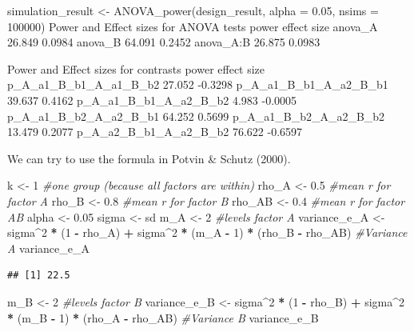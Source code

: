 \documentclass[]{book}
\newenvironment{Shaded}{\begin{snugshade}}{\end{snugshade}}
\newcommand{\CommentTok}[1]{\textcolor[rgb]{0.56,0.35,0.01}{\textit{#1}}}
\newcommand{\DecValTok}[1]{\textcolor[rgb]{0.00,0.00,0.81}{#1}}
\newcommand{\FloatTok}[1]{\textcolor[rgb]{0.00,0.00,0.81}{#1}}
\newcommand{\NormalTok}[1]{#1}
\newcommand{\OperatorTok}[1]{\textcolor[rgb]{0.81,0.36,0.00}{\textbf{#1}}}
\newcommand{\StringTok}[1]{\textcolor[rgb]{0.31,0.60,0.02}{#1}}
\begin{document}
simulation\_result \textless{}- ANOVA\_power(design\_result, alpha = 0.05, nsims = 100000)
Power and Effect sizes for ANOVA tests
power effect size
anova\_A 26.849 0.0984
anova\_B 64.091 0.2452
anova\_A:B 26.875 0.0983

Power and Effect sizes for contrasts
power effect size
p\_A\_a1\_B\_b1\_A\_a1\_B\_b2 27.052 -0.3298
p\_A\_a1\_B\_b1\_A\_a2\_B\_b1 39.637 0.4162
p\_A\_a1\_B\_b1\_A\_a2\_B\_b2 4.983 -0.0005
p\_A\_a1\_B\_b2\_A\_a2\_B\_b1 64.252 0.5699
p\_A\_a1\_B\_b2\_A\_a2\_B\_b2 13.479 0.2077
p\_A\_a2\_B\_b1\_A\_a2\_B\_b2 76.622 -0.6597

We can try to use the formula in Potvin \& Schutz (2000).

\begin{Shaded}
\begin{Highlighting}[]
\NormalTok{k <-}\StringTok{ }\DecValTok{1} \CommentTok{#one group (because all factors are within)}
\NormalTok{rho_A <-}\StringTok{ }\FloatTok{0.5} \CommentTok{#mean r for factor A}
\NormalTok{rho_B <-}\StringTok{ }\FloatTok{0.8} \CommentTok{#mean r for factor B}
\NormalTok{rho_AB <-}\StringTok{ }\FloatTok{0.4} \CommentTok{#mean r for factor AB}
\NormalTok{alpha <-}\StringTok{ }\FloatTok{0.05}
\NormalTok{sigma <-}\StringTok{ }\NormalTok{sd}
\NormalTok{m_A <-}\StringTok{ }\DecValTok{2} \CommentTok{#levels factor A}
\NormalTok{variance_e_A <-}\StringTok{ }\NormalTok{sigma}\OperatorTok{^}\DecValTok{2} \OperatorTok{*}\StringTok{ }\NormalTok{(}\DecValTok{1} \OperatorTok{-}\StringTok{ }\NormalTok{rho_A) }\OperatorTok{+}\StringTok{ }\NormalTok{sigma}\OperatorTok{^}\DecValTok{2} \OperatorTok{*}\StringTok{ }\NormalTok{(m_A }\OperatorTok{-}\StringTok{ }\DecValTok{1}\NormalTok{) }\OperatorTok{*}\StringTok{ }\NormalTok{(rho_B }\OperatorTok{-}\StringTok{ }\NormalTok{rho_AB) }\CommentTok{#Variance A}
\NormalTok{variance_e_A}
\end{Highlighting}
\end{Shaded}

\begin{verbatim}
## [1] 22.5
\end{verbatim}

\begin{Shaded}
\begin{Highlighting}[]
\NormalTok{m_B <-}\StringTok{ }\DecValTok{2} \CommentTok{#levels factor B}
\NormalTok{variance_e_B <-}\StringTok{ }\NormalTok{sigma}\OperatorTok{^}\DecValTok{2} \OperatorTok{*}\StringTok{ }\NormalTok{(}\DecValTok{1} \OperatorTok{-}\StringTok{ }\NormalTok{rho_B) }\OperatorTok{+}\StringTok{ }\NormalTok{sigma}\OperatorTok{^}\DecValTok{2} \OperatorTok{*}\StringTok{ }\NormalTok{(m_B }\OperatorTok{-}\StringTok{ }\DecValTok{1}\NormalTok{) }\OperatorTok{*}\StringTok{ }\NormalTok{(rho_A }\OperatorTok{-}\StringTok{ }\NormalTok{rho_AB) }\CommentTok{#Variance B}
\NormalTok{variance_e_B}
\end{Highlighting}
\end{Shaded}
\end{document}

